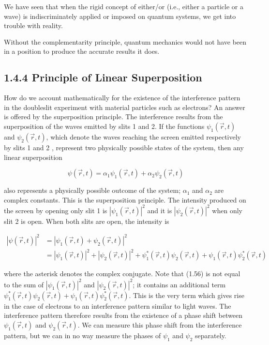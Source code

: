 \documentclass[10pt]{article}
\begin{document}
We have seen that when the rigid concept of either/or (i.e., either a particle or a wave) is indiscriminately applied or imposed on quantum systems, we get into trouble with reality.

Without the complementarity principle, quantum mechanics would not have been in a position to produce the accurate results it does.

\subsection*{1.4.4 Principle of Linear Superposition}
How do we account mathematically for the existence of the interference pattern in the doubleslit experiment with material particles such as electrons? An answer is offered by the superposition principle. The interference results from the superposition of the waves emitted by slits 1 and 2. If the functions $\psi_{1}(\vec{r}, t)$ and $\psi_{2}(\vec{r}, t)$, which denote the waves reaching the screen emitted respectively by slits 1 and 2 , represent two physically possible states of the system, then any linear superposition


\begin{equation*}
\psi(\vec{r}, t)=\alpha_{1} \psi_{1}(\vec{r}, t)+\alpha_{2} \psi_{2}(\vec{r}, t) \tag{1.55}
\end{equation*}


also represents a physically possible outcome of the system; $\alpha_{1}$ and $\alpha_{2}$ are complex constants. This is the superposition principle. The intensity produced on the screen by opening only slit 1 is $\left|\psi_{1}(\vec{r}, t)\right|^{2}$ and it is $\left|\psi_{2}(\vec{r}, t)\right|^{2}$ when only slit 2 is open. When both slits are open, the intensity is


\begin{align*}
|\psi(\vec{r}, t)|^{2} & =\left|\psi_{1}(\vec{r}, t)+\psi_{2}(\vec{r}, t)\right|^{2} \\
& =\left|\psi_{1}(\vec{r}, t)\right|^{2}+\left|\psi_{2}(\vec{r}, t)\right|^{2}+\psi_{1}^{*}(\vec{r}, t) \psi_{2}(\vec{r}, t)+\psi_{1}(\vec{r}, t) \psi_{2}^{*}(\vec{r}, t) \tag{1.56}
\end{align*}


where the asterisk denotes the complex conjugate. Note that (1.56) is not equal to the sum of $\left|\psi_{1}(\vec{r}, t)\right|^{2}$ and $\left|\psi_{2}(\vec{r}, t)\right|^{2}$; it contains an additional term $\psi_{1}^{*}(\vec{r}, t) \psi_{2}(\vec{r}, t)+\psi_{1}(\vec{r}, t) \psi_{2}^{*}(\vec{r}, t)$. This is the very term which gives rise in the case of electrons to an interference pattern similar to light waves. The interference pattern therefore results from the existence of a phase shift between $\psi_{1}(\vec{r}, t)$ and $\psi_{2}(\vec{r}, t)$. We can measure this phase shift from the interference pattern, but we can in no way measure the phases of $\psi_{1}$ and $\psi_{2}$ separately.
\end{document}
